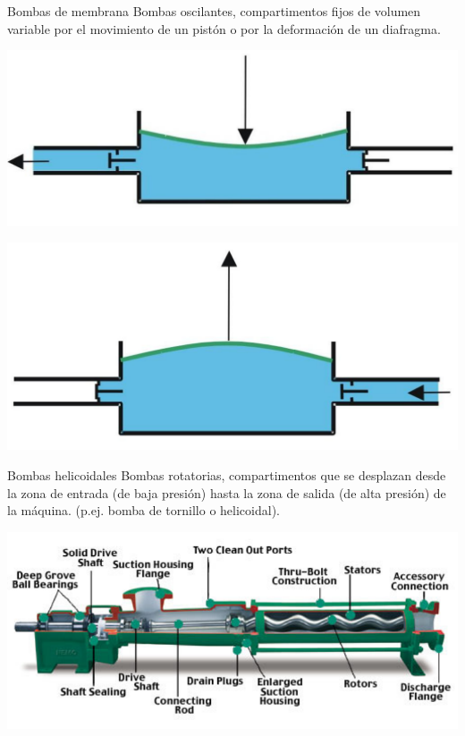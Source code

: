 \documentclass[xcolor={usenames,svgnames,dvipsnames}]{beamer}
\begin{document}
\begin{frame}[label={sec:org1e73092}]{Bombas de membrana}
\alert{Bombas oscilantes}, compartimentos fijos de volumen variable por el movimiento de un pistón o por la deformación de un diafragma.
\begin{center}
\includegraphics[height=0.3\textheight]{../figs/800px-Bomba_diafragma_impulsando.pdf}
\end{center}
\begin{center}
\includegraphics[height=0.3\textheight]{../figs/Bomba_diafragma_aspirando.pdf}
\end{center}
\end{frame}

\begin{frame}[label={sec:org8aa52c8}]{Bombas helicoidales}
\alert{Bombas rotatorias}, compartimentos que se desplazan desde la zona de entrada (de baja presión) hasta la zona de salida (de alta presión) de la máquina. (p.ej. bomba de tornillo o helicoidal).

\begin{center}
\includegraphics[width=.9\linewidth]{../figs/bombatornillo.pdf}
\end{center}
\end{frame}
\end{document}
